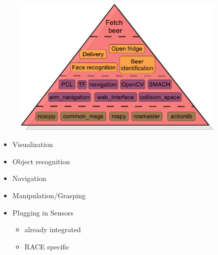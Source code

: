 \noindent \begin{center}
\begin{figure}[H]
\noindent \centering{}\includegraphics[width=0.9\textwidth]{images/ROSFetchBeer}
\end{figure}

\par\end{center}


\lyxframeend{}


\lyxframeend{}
\begin{itemize}
\item Visualization
\item Object recognition
\item Navigation
\item Manipulation/Grasping
\item Plugging in Sensors

\begin{itemize}
\item already integrated
\item RACE specific
\end{itemize}
\end{itemize}

\lyxframeend{}

